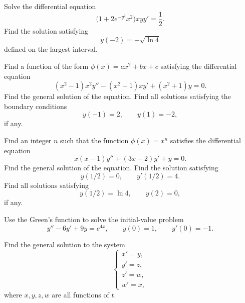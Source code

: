 \begin{problem}
Solve the differential equation
\[
\bigl(1+2e^{-y^2}x^2\bigr)xyy'=\frac12.
\]
Find the solution satisfying
\[
y(-2)=-\sqrt{\ln 4}
\]
defined on the largest interval.
\end{problem}

\begin{problem}
Find a function of the form $\phi(x)=ax^2+bx+c$ satisfying the differential equation
\[
(x^2-1)x^2y''-(x^2+1)xy'+(x^2+1)y=0.
\]
Find the general solution of the equation. Find all solutions satisfying the boundary conditions
\[
y(-1)=2,
\qquad
y(1)=-2,
\]
if any.
\end{problem}

\begin{problem}
Find an integer $n$ such that the function $\phi(x)=x^n$ satisfies the differential equation
\[
x(x-1)y''+(3x-2)y'+y=0.
\]
Find the general solution of the equation. Find the solution satisfying
\[
y(1/2)=0,
\qquad
y'(1/2)=4.
\]
Find all solutions satisfying
\[
y(1/2)=\ln 4,
\qquad
y(2)=0,
\]
if any.
\end{problem}

\begin{problem}
Use the Green's function to solve the initial-value problem
\[
y''-6y'+9y=e^{4x},
\qquad
y(0)=1,
\qquad
y'(0)=-1.
\]
\end{problem}

\begin{problem}
Find the general solution to the system
\[
\begin{cases}
x'=y,\\
y'=z,\\
z'=w,\\
w'=x,
\end{cases}
\]
where $x,y,z,w$ are all functions of $t$.
\end{problem}

